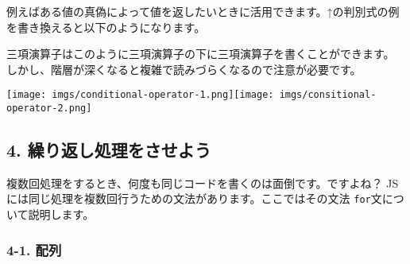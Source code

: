 例えばある値の真偽によって値を返したいときに活用できます。↑の判別式の例を書き換えると以下のようになります。

\begin{Shaded}
\begin{Highlighting}[]
\OperatorTok{,}\OperatorTok{,}\OperatorTok{;}
\OperatorTok{=} \OperatorTok{\textless{}}\OperatorTok{\textgreater{};}
\OperatorTok{=} \OperatorTok{\textless{}}\OperatorTok{\textgreater{};}
\OperatorTok{=} \OperatorTok{\textless{}}\OperatorTok{\textgreater{};}

\OperatorTok{=}\OperatorTok{**}  \OperatorTok{{-}}  \OperatorTok{*}\OperatorTok{*}\OperatorTok{;}

\OperatorTok{=}\OperatorTok{===} 
             
            \OperatorTok{:}\OperatorTok{\textgreater{}} 
               
              \OperatorTok{:} \OperatorTok{;}

\OperatorTok{;}
\end{Highlighting}
\end{Shaded}

三項演算子はこのように三項演算子の下に三項演算子を書くことができます。
しかし、階層が深くなると複雑で読みづらくなるので注意が必要です。

\texttt{[image: imgs/conditional-operator-1.png]}\texttt{[image: imgs/consitional-operator-2.png]}

\subsection{4.
繰り返し処理をさせよう}\label{ux7e70ux308aux8fd4ux3057ux51e6ux7406ux3092ux3055ux305bux3088ux3046}

複数回処理をするとき、何度も同じコードを書くのは面倒です。ですよね？
JSには同じ処理を複数回行うための文法があります。ここではその文法
\texttt{for}文について説明します。

\subsubsection{4-1. 配列}\label{ux914dux5217}

